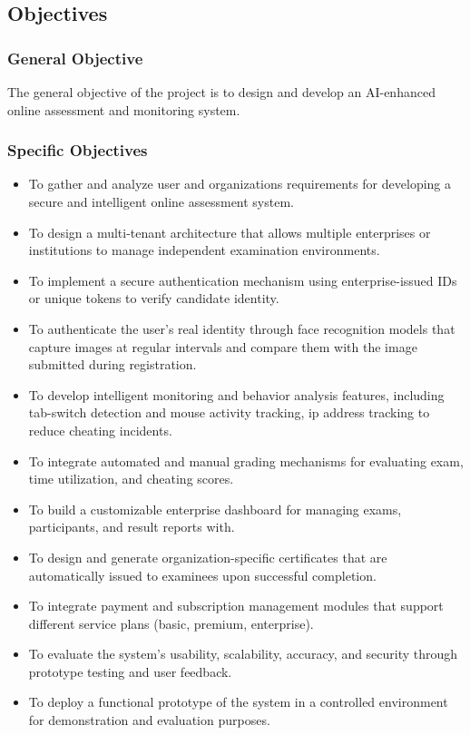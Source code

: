 \subsection{Objectives}
\subsubsection{General Objective}
The general objective of the project is to design and develop an AI-enhanced online assessment and monitoring system.

\subsubsection{Specific Objectives}
\begin{itemize}
    \item To gather and analyze user and organizations requirements for developing a secure and intelligent online assessment system.
    \item To design a multi-tenant architecture that allows multiple enterprises or institutions to manage independent examination environments.
    \item To implement a secure authentication mechanism using enterprise-issued IDs or unique tokens to verify candidate identity.
    \item To authenticate the user's real identity through face recognition models that capture images at regular intervals and compare them with the image submitted during registration.
    \item To develop intelligent monitoring and behavior analysis features, including tab-switch detection and mouse activity tracking, ip address tracking to reduce cheating incidents.
    \item To integrate automated and manual grading mechanisms for evaluating exam, time utilization, and cheating scores.
    \item To build a customizable enterprise dashboard for managing exams, participants, and result reports with.
    \item To design and generate organization-specific certificates that are automatically issued to examinees upon successful completion. 
    \item To integrate payment and subscription management modules that support different service plans (basic, premium, enterprise).
    \item To evaluate the system’s usability, scalability, accuracy, and security through prototype testing and user feedback.
    \item To deploy a functional prototype of the system in a controlled environment for demonstration and evaluation purposes.
    
\end{itemize}

